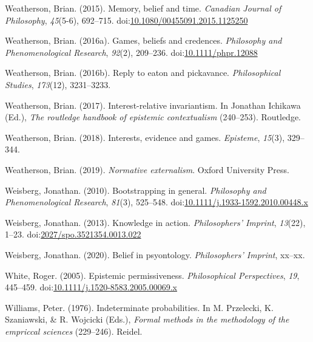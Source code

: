 \documentclass[
  12pt,
  letterpaper,
]{scrbook}
\newlength{\cslhangindent}
\newenvironment{CSLReferences}[2] %
 {\begin{list}{}{%
  \setlength{\itemindent}{0pt}
  \setlength{\leftmargin}{0pt}
  \setlength{\parsep}{0pt}
  \ifodd #1
   \setlength{\leftmargin}{\cslhangindent}
   \setlength{\itemindent}{-1\cslhangindent}
  \fi
  \setlength{\itemsep}{#2\baselineskip}}}
 {\end{list}}
\begin{document}
\begin{CSLReferences}{1}{0}
Weatherson, Brian. (2015). Memory, belief and time. \emph{Canadian
Journal of Philosophy}, \emph{45}(5-6), 692--715.
doi:\href{https://doi.org/10.1080/00455091.2015.1125250}{10.1080/00455091.2015.1125250}

Weatherson, Brian. (2016a). Games, beliefs and credences.
\emph{Philosophy and Phenomenological Research}, \emph{92}(2), 209--236.
doi:\href{https://doi.org/10.1111/phpr.12088}{10.1111/phpr.12088}

Weatherson, Brian. (2016b). Reply to eaton and pickavance.
\emph{Philosophical Studies}, \emph{173}(12), 3231--3233.

Weatherson, Brian. (2017). Interest-relative invariantism. In Jonathan
Ichikawa (Ed.), \emph{The routledge handbook of epistemic contextualism}
(240--253). Routledge.

Weatherson, Brian. (2018). Interests, evidence and games.
\emph{Episteme}, \emph{15}(3), 329--344.

Weatherson, Brian. (2019). \emph{Normative externalism}. Oxford
University Press.

Weisberg, Jonathan. (2010). Bootstrapping in general. \emph{Philosophy
and Phenomenological Research}, \emph{81}(3), 525--548.
doi:\href{https://doi.org/10.1111/j.1933-1592.2010.00448.x}{10.1111/j.1933-1592.2010.00448.x}

Weisberg, Jonathan. (2013). Knowledge in action. \emph{Philosophers'
Imprint}, \emph{13}(22), 1--23.
doi:\href{https://doi.org/2027/spo.3521354.0013.022}{2027/spo.3521354.0013.022}

Weisberg, Jonathan. (2020). Belief in psyontology. \emph{Philosophers'
Imprint}, xx--xx.

White, Roger. (2005). Epistemic permissiveness. \emph{Philosophical
Perspectives}, \emph{19}, 445--459.
doi:\href{https://doi.org/10.1111/j.1520-8583.2005.00069.x}{10.1111/j.1520-8583.2005.00069.x}

Williams, Peter. (1976). Indeterminate probabilities. In M. Przelecki,
K. Szaniawski, \& R. Wojcicki (Eds.), \emph{Formal methods in the
methodology of the empriccal sciences} (229--246). Reidel.


\end{CSLReferences}
\end{document}

